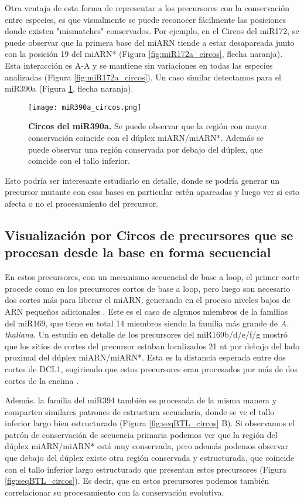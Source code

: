 Otra ventaja de esta forma de representar a los precursores con la conservación entre especies, es que visualmente se puede reconocer fácilmente las posiciones donde existen "mismatches" conservados. 
Por ejemplo, en el Circos del miR172, se puede observar que la primera base del miARN tiende a estar desapareada junto con la posición 19 del miARN* (Figura \ref{fig:miR172a_circos}, flecha naranja). 
Esta interacción es A-A y se mantiene sin variaciones en todas las especies analizadas (Figura \ref{fig:miR172a_circos}).
Un caso similar detectamos para el miR390a (Figura \ref{fig:miR390a_circos}, flecha naranja).

\begin{figure}[htbp!] 
    \centering    
    \texttt{[image: miR390a\_circos.png]}
    \caption[Circos del miR172a]{
    \textbf{Circos del miR390a.}
    Se puede observar que la región con mayor conservación coincide con el dúplex miARN/miARN*.
    Además se puede observar una región conservada por debajo del dúplex, que coincide con el tallo inferior.
    }
     \label{fig:miR390a_circos}
\end{figure}


Esto podría ser interesante estudiarlo en detalle, donde se podría generar un precursor mutante con esas bases en particular estén apareadas y luego ver si esto afecta o no el procesamiento del precursor.  

\subsection{Visualización por Circos de precursores que se procesan desde la base en forma secuencial}

En estos precursores, con un mecanismo secuencial de base a loop, el primer corte procede como en los precursores cortos de base a loop, pero luego son necesario dos cortes más para liberar el miARN, generando en el proceso niveles bajos de ARN pequeños adicionales \citep{Bologna2013}.
Este es el caso de algunos miembros de la  familias del miR169, que tiene en total 14 miembros siendo la familia más grande de \textit{A. thaliana}.
Un estudio en detalle de los precursores del miR169b/d/e/f/g mostró que los sitios de cortes del precursor estaban localizados 21 nt por debajo del lado proximal del dúplex miARN/miARN*.
Esta es la distancia esperada entre dos cortes de DCL1, sugiriendo que estos precursores eran procesados por más de dos cortes de la encima \citep{Bologna2013}.

Además. la familia del miR394 también es procesada de la misma manera y comparten similares patrones de estructura secundaria, donde se ve el tallo inferior largo bien estructurado (Figura \ref{fig:seqBTL_circos} B).
Si observamos el patrón de conservación de secuencia primaria podemos ver que la región del dúplex miARN/miARN* está muy conservada, pero además podemos observar que debajo del dúplex existe otra región conservada y estructurada, que coincide con el tallo inferior largo estructurado que presentan estos precursores (Figura \ref{fig:seqBTL_circos}).
Es decir, que en estos precursores podemos también correlacionar su procesamiento con la conservación evolutiva.

